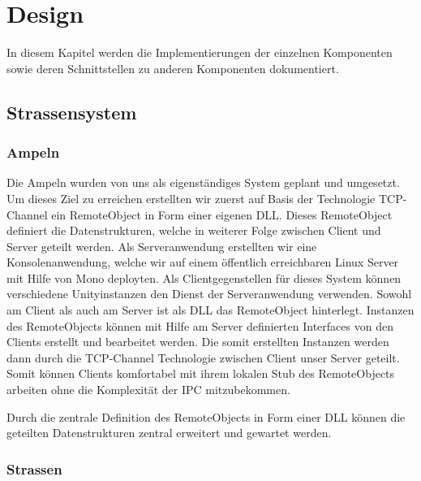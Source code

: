 
\chapter{Design}
\label{Design}

In diesem Kapitel werden die Implementierungen der einzelnen Komponenten sowie deren Schnittstellen zu anderen Komponenten dokumentiert.



\thispagestyle{standard}
\pagestyle{standard}

\section{Strassensystem}
\label{Strassensystem}

\subsection{Ampeln}

Die Ampeln wurden von uns als eigenständiges System geplant und umgesetzt. Um dieses Ziel zu erreichen erstellten wir zuerst auf Basis der Technologie TCP-Channel ein RemoteObject in Form einer eigenen DLL. Dieses RemoteObject definiert die Datenstrukturen, welche in weiterer Folge zwischen Client und Server geteilt werden. Als Serveranwendung erstellten wir eine Konsolenanwendung, welche wir auf einem öffentlich erreichbaren Linux Server mit Hilfe von Mono deployten. Als Clientgegenstellen für dieses System können verschiedene Unityinstanzen den Dienst der Serveranwendung verwenden. Sowohl am Client als auch am Server ist als DLL das RemoteObject hinterlegt. Instanzen des RemoteObjects können mit Hilfe am Server definierten Interfaces von den Clients erstellt und bearbeitet werden. Die somit erstellten Instanzen werden dann durch die TCP-Channel Technologie zwischen Client unser Server geteilt. Somit können Clients komfortabel mit ihrem lokalen Stub des RemoteObjects arbeiten ohne die Komplexität der IPC mitzubekommen. 

Durch die zentrale Definition des RemoteObjects in Form einer DLL können die geteilten Datenstrukturen zentral erweitert und gewartet werden.

\subsection{Strassen}

